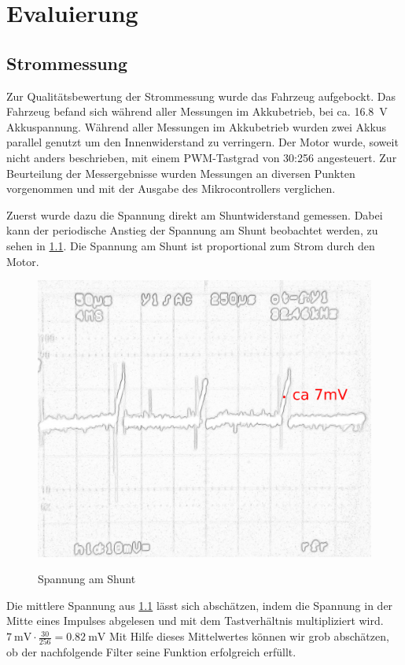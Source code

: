 \chapter{Evaluierung}



\section{Strommessung}

Zur Qualitätsbewertung der Strommessung wurde das Fahrzeug aufgebockt. 
Das Fahrzeug befand sich während aller Messungen im Akkubetrieb, bei ca. \SI{16,8}{\volt} Akkuspannung.
Während aller Messungen im Akkubetrieb wurden zwei Akkus parallel genutzt um den Innenwiderstand zu verringern.
Der Motor wurde, soweit nicht anders beschrieben, mit einem PWM-Tastgrad von 30:256 angesteuert.
Zur Beurteilung der Messergebnisse wurden Messungen an diversen Punkten vorgenommen und mit der Ausgabe des Mikrocontrollers verglichen.

Zuerst wurde dazu die Spannung direkt am Shuntwiderstand gemessen.
Dabei kann der periodische Anstieg der Spannung am Shunt beobachtet werden, zu sehen in \cref{fig:filter_eingang}. Die Spannung am Shunt ist proportional zum Strom durch den Motor.

\begin{figure}[H]
\centering
\includegraphics[width=.8\textwidth]{filter_eingang_mak.png}\\
\caption{Spannung am Shunt}%
\label{fig:filter_eingang}
\end{figure}

Die mittlere Spannung aus \cref{fig:filter_eingang} lässt sich abschätzen, indem die Spannung in der Mitte eines Impulses abgelesen und mit dem Tastverhältnis multipliziert wird.
$\SI{7}{\mV}\cdot\frac{30}{256}=\SI{0,82}{\mV} $
Mit Hilfe dieses Mittelwertes können wir grob abschätzen, ob der nachfolgende Filter seine Funktion erfolgreich erfüllt.


